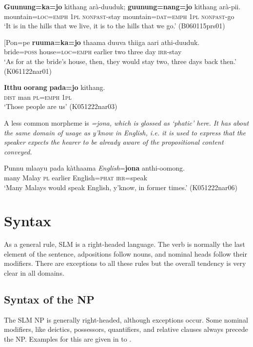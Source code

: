  
\ea\label{ex:jo:argfoc}
\gll \textbf{Guunung=ka=jo} kithang arà-duuduk; \textbf{guunung=nang=jo} kithang arà-pii. \\
      mountain=\textsc{loc}=\textsc{emph} 1\textsc{pl} \textsc{nonpast}-stay mountain=\textsc{dat}=\textsc{emph} 1\textsc{pl} \textsc{nonpast}-go \\
    `It is in the hills that we live, it is to the hills that we go.' (B060115prs01)
\z
 
\ea \label{ex:jo:contrtop}
\gll [Pon=pe \textbf{ruuma=ka=jo} thaama duuva thiiga aari athi-duuduk. \\
      bride=\textsc{poss} house=\textsc{loc}=\textsc{emph} earlier two three day \textsc{irr}-stay \\
    `As for at the bride's house, then, they would stay two, three days back then.'  (K061122nar01)
\z


 \ea\label{ex:jo:speficicational}
   \gll \textbf{Itthu}    \textbf{oorang} \textbf{pada=jo}       kithang. \\
    \textsc{dist} man \textsc{pl}=\textsc{emph} 1\textsc{pl} \\
`Those people are us' (K051222nar03)
\z



A less common morpheme is \em =jona\em, which is glossed as `phatic' here. It has about the same domain of usage as \em y'know \em in English, i.e. it is used to express that the speaker expects the hearer to be already aware of the propositional content conveyed.


\ea\label{ex:jona}
\gll Punnu mlaayu pada kàthaama {\em English}=\textbf{jona} anthi-oomong. \\
       many Malay \textsc{pl} earlier English=\textsc{phat} \textsc{irr}=speak \\
    `Many Malays would speak English, y'know,  in former times.'  (K051222nar06)
\z


\section{Syntax}
As a general rule, SLM is a right-headed language. The verb is normally the last element of the sentence, adpositions follow nouns, and nominal heads follow their modifiers. There are exceptions to all these rules but the overall tendency is very clear in all domains.

\subsection{Syntax of the NP}
The SLM NP is generally right-headed, although exceptions occur. Some nominal modifiers, like deictics, possessors, quantifiers, and relative clauses always precede the NP. Examples for this are given in  to .



